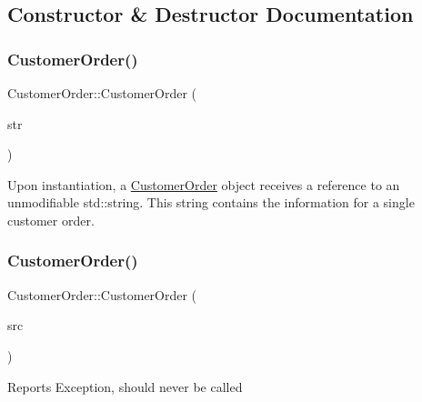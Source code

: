 \subsection{Constructor \& Destructor Documentation}
\mbox{\label{class_customer_order_a0b43beee099ac2772cadd8f3df890701}} 
\subsubsection{\texorpdfstring{Customer\+Order()}{CustomerOrder()}\hspace{0.1cm}{\footnotesize\ttfamily [1/3]}}
{\footnotesize\ttfamily Customer\+Order\+::\+Customer\+Order (\begin{DoxyParamCaption}\item[{const std\+::string \&}]{str }\end{DoxyParamCaption})}

Upon instantiation, a \mbox{\hyperlink{class_customer_order}{Customer\+Order}} object receives a reference to an unmodifiable std\+::string. This string contains the information for a single customer order. \mbox{\label{class_customer_order_ad5d7da49c28e5006f326e1709b072516}} 
\subsubsection{\texorpdfstring{Customer\+Order()}{CustomerOrder()}\hspace{0.1cm}{\footnotesize\ttfamily [2/3]}}
{\footnotesize\ttfamily Customer\+Order\+::\+Customer\+Order (\begin{DoxyParamCaption}\item[{const \mbox{\hyperlink{class_customer_order}{Customer\+Order}} \&}]{src }\end{DoxyParamCaption})}

Reports Exception, should never be called \mbox{\label{class_customer_order_addc080f9b7685c1c2d788b418bca40a8}} 
